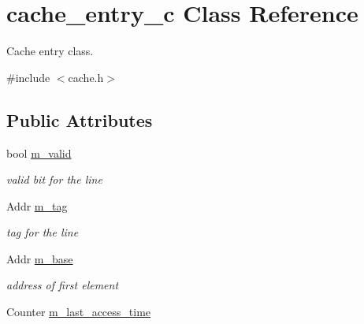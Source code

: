 \hypertarget{classcache__entry__c}{
\section{cache\_\-entry\_\-c Class Reference}
\label{classcache__entry__c}
}


Cache entry class.  




{\ttfamily \#include $<$cache.h$>$}

\subsection*{Public Attributes}
\begin{DoxyCompactItemize}
\item 
\hypertarget{classcache__entry__c_aa03d1da7bc05d3dc03527491a0f7d8d9}{
bool \hyperlink{classcache__entry__c_aa03d1da7bc05d3dc03527491a0f7d8d9}{m\_\-valid}}
\label{classcache__entry__c_aa03d1da7bc05d3dc03527491a0f7d8d9}

\begin{DoxyCompactList}\small\item\em valid bit for the line \item\end{DoxyCompactList}\item 
\hypertarget{classcache__entry__c_a6657865c8a61ceaace68e7153128949c}{
Addr \hyperlink{classcache__entry__c_a6657865c8a61ceaace68e7153128949c}{m\_\-tag}}
\label{classcache__entry__c_a6657865c8a61ceaace68e7153128949c}

\begin{DoxyCompactList}\small\item\em tag for the line \item\end{DoxyCompactList}\item 
\hypertarget{classcache__entry__c_aa1be6909352c91870a59e859f53ad0cc}{
Addr \hyperlink{classcache__entry__c_aa1be6909352c91870a59e859f53ad0cc}{m\_\-base}}
\label{classcache__entry__c_aa1be6909352c91870a59e859f53ad0cc}

\begin{DoxyCompactList}\small\item\em address of first element \item\end{DoxyCompactList}\item 
\hypertarget{classcache__entry__c_ad52ca6184668ca6ad7444e3121f231cf}{
Counter \hyperlink{classcache__entry__c_ad52ca6184668ca6ad7444e3121f231cf}{m\_\-last\_\-access\_\-time}}
\label{classcache__entry__c_ad52ca6184668ca6ad7444e3121f231cf}


\end{DoxyCompactItemize}
